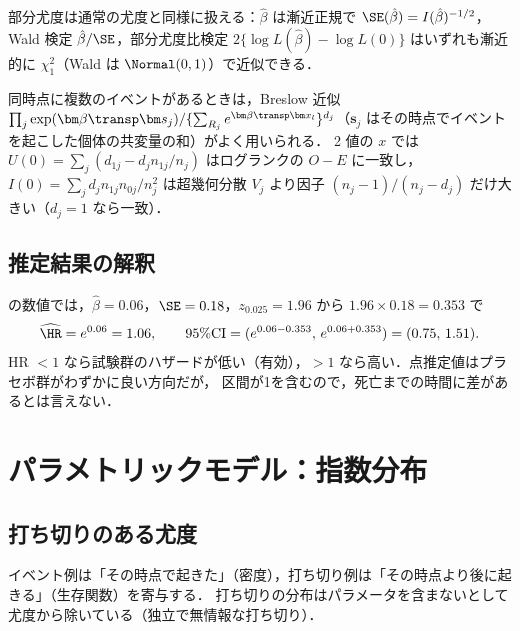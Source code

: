 部分尤度は通常の尤度と同様に扱える：$\hat\beta$ は漸近正規で $\SE(\hat\beta)=I(\hat\beta)^{-1/2}$，
Wald 検定 $\hat\beta/\SE$，部分尤度比検定 $2\{\log L(\hat\beta)-\log L(0)\}$ はいずれも漸近的に $\chi^2_1$（Wald は $\Normal(0,1)$）で近似できる．
\begin{supbox}
同時点に複数のイベントがあるときは，Breslow 近似 $\prod_j\exp(\bm\beta\transp\bm s_j)/\{\sum_{R_j}e^{\bm\beta\transp\bm x_l}\}^{d_j}$（$\bm s_j$ はその時点でイベントを起こした個体の共変量の和）がよく用いられる．
2 値の $x$ では $U(0)=\sum_j(d_{1j}-d_jn_{1j}/n_j)$ はログランクの $O-E$ に一致し，$I(0)=\sum_jd_jn_{1j}n_{0j}/n_j^2$ は超幾何分散 $V_j$ より因子 $(n_j-1)/(n_j-d_j)$ だけ大きい（$d_j=1$ なら一致）．
\end{supbox}

\subsection{推定結果の解釈}\label{subsec:10-interp}
 の数値では，$\hat\beta=0.06$，$\SE=0.18$，$z_{0.025}=1.96$ から $1.96\times0.18=0.353$ で
\[
\widehat{\HR}=e^{0.06}=1.06,\qquad 95\%\text{CI}=(e^{0.06-0.353},\,e^{0.06+0.353})=(0.75,\,1.51).
\]
HR $<1$ なら試験群のハザードが低い（有効），$>1$ なら高い．点推定値はプラセボ群がわずかに良い方向だが，
区間が1を含むので，死亡までの時間に差があるとは言えない．

\section{パラメトリックモデル：指数分布}\label{sec:10-exp}
\Hissu\Hinshutsu
\subsection{打ち切りのある尤度}
イベント例は「その時点で起きた」（密度），打ち切り例は「その時点より後に起きる」（生存関数）を寄与する．
打ち切りの分布はパラメータを含まないとして尤度から除いている（独立で無情報な打ち切り）．

